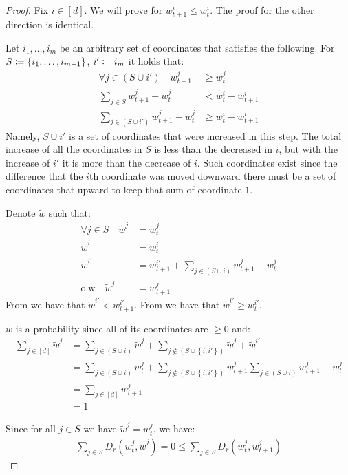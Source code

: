 \documentclass[10pt]{article}
\theoremstyle{definition}
\theoremstyle{remark}
\newcommand{\curly}[1]{ {\left\{ #1 \right\}}}
\newcommand{\roundy}[1]{ {\left( #1 \right)}}
\begin{document}
\begin{proof}
Fix $i\in[d]$. We will prove for $w_{t+1}^i \le w_t^i$. The proof for the other direction is identical.

Let $i_1, \ldots, i_m$ be an arbitrary set of coordinates that satisfies the following. For $S\coloneqq \{i_1, \ldots, i_{m-1}\}$, $i' \coloneqq i_m$ it holds that:
\begin{align}
    \forall j\in \roundy{S\cup i'} \quad w_{t+1}^j &\ge w_t^j \label{eq:S bugger}\\
    \sum_{j\in S}w_{t+1}^j - w_t^j &< w_t^i - w_{t+1}^i \label{eq:S isnt enough}\\
    \sum_{j\in \roundy{S\cup i'}}w_{t+1}^j - w_t^j &\ge w_t^i - w_{t+1}^i \label{eq:S with i'}
\end{align}
Namely, $S\cup i'$ is a set of coordinates that were increased in this step. The total increase of all the coordinates in $S$ is less than the decreased in $i$, but with the increase of $i'$ it is more than the decrease of $i$. Such coordinates exist since the difference that the $i$th coordinate was moved downward there must be a set of coordinates that upward to keep that sum of coordinate $1$.

Denote $\tilde{w}$ such that:
\begin{align*}
    \forall j\in S \quad \tilde{w}^j &= w_t^j \\
    \tilde{w}^i &= w_t^i\\
    \tilde{w}^{i'} &= w_{t+1}^{i'} + \sum_{j\in \roundy{S\cup i}}w_{t+1}^j - w_t^j \\
    \text{o.w} \quad \tilde{w}^j &= w_{t+1}^j
\end{align*}
From  we have that $\tilde{w}^{i'} < w_{t+1}^{i'}$. From  we have that $\tilde{w}^{i'} \ge w_{t}^{i'}$.

$\tilde{w}$ is a probability since all of its coordinates are $\ge 0$ and:
\begin{align*}
    \sum_{j\in[d]} \tilde{w}^j &= \sum_{j\in (S \cup i)}\tilde{w}^j + \sum_{j\notin (S \cup \curly{i,i'})}\tilde{w}^j + \tilde{w}^{i'}\\
    &= \sum_{j\in (S \cup i)}{w}_{t}^j + \sum_{j\notin (S \cup \curly{i,i'})}{w}_{t+1}^j \sum_{j\in \roundy{S\cup i}}w_{t+1}^j - w_t^j\\
    &= \sum_{j\in[d]} {w}_{t+1}^j \\
    &= 1
\end{align*}

Since for all $j\in S$ we have $\tilde{w}^j = w_t^j$, we have:
\begin{align*}
    \sum_{j\in S} D_r(w_t^j,\tilde{w}^j) = 0 \le \sum_{j\in S} D_r(w_t^j,w_{t+1}^j)
\end{align*}


\end{proof}
\end{document}
